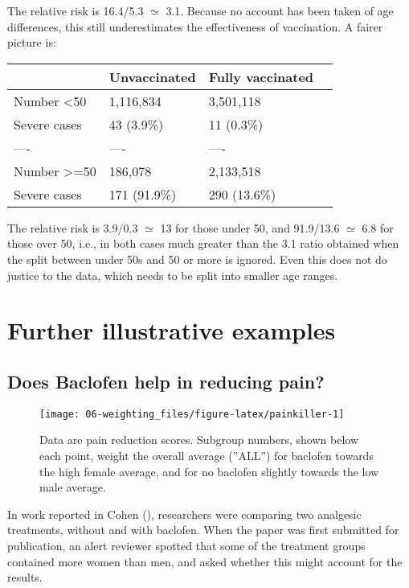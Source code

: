 \documentclass[
  10ptls,
  b5paper]{book}
\begin{document}
The relative risk is 16.4/5.3 \(\simeq\) 3.1. Because no account has been taken of age differences, this still underestimates the effectiveness of vaccination. A fairer picture is:

\begin{longtable}[]{@{}llll@{}}
\toprule\noalign{}
& Unvaccinated & Fully vaccinated & \\
\midrule\noalign{}
\endhead
\bottomrule\noalign{}
\endlastfoot
Number \textless50 & 1,116,834 & 3,501,118 & \\
Severe cases & 43 (3.9\%) & 11 (0.3\%) & \\
---- & ---- & ---- & \\
Number \textgreater=50 & 186,078 & 2,133,518 & \\
Severe cases & 171 (91.9\%) & 290 (13.6\%) & \\
\end{longtable}

The relative risk is 3.9/0.3 \(\simeq\) 13 for those under 50, and 91.9/13.6 \(\simeq\) 6.8 for those over 50, i.e., in both cases much greater than the 3.1 ratio obtained when the split between under 50s and 50 or more is ignored. Even this does not do justice to the data, which needs to be split into smaller age ranges.

\section{Further illustrative examples}\label{further-illustrative-examples}

\subsection*{Does Baclofen help in reducing pain?}\label{does-baclofen-help-in-reducing-pain}

\begin{figure}[H]

{\centering \texttt{[image: 06-weighting\_files/figure-latex/painkiller-1]} 

}

\caption{Data are pain reduction scores. Subgroup numbers, shown
    below each point, weight the overall average (''ALL'') for
    baclofen towards the high female average, and for no baclofen
    slightly towards the low male average.}\label{fig:painkiller}
\end{figure}

In work reported in Cohen (), researchers were comparing two analgesic treatments, without and with baclofen. When the paper was first submitted for publication, an alert reviewer spotted that some of the treatment groups contained more women than men, and asked whether this might account for the results.
\end{document}
